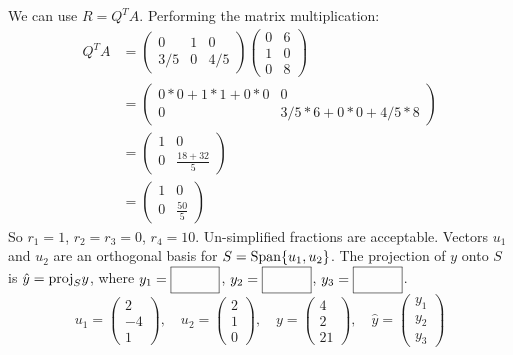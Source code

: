     \ifnum {} {\color{DarkBlue} We can use $R=Q^TA$. Performing the matrix multiplication:
    \begin{align}Q^TA &=  \begin{pmatrix} 0&1&0\\3/5&0&4/5\end{pmatrix} \begin{pmatrix} 0&6\\1&0\\0&8\end{pmatrix} \\
    &=  \begin{pmatrix} 0*0 + 1*1 + 0*0 & 0 \\ 0 & 3/5*6 + 0*0 + 4/5*8 \end{pmatrix} \\
    &= \begin{pmatrix} 1 & 0 \\ 0 & \frac{18+32}{5} \end{pmatrix} \\
    &= \begin{pmatrix} 1 & 0 \\ 0 & \frac{50}{5} \end{pmatrix} 
    \end{align}
    So $r_1 = 1$, $r_2=r_3=0$, $r_4=10$. Un-simplified fractions are acceptable. } \fi 
\fi 
\ifnum {}
    Vectors $u_1$ and $u_2$ are an orthogonal basis for $S=\text{Span}\{u_1,u_2\}$. The projection of $y$ onto $S$ is $\hat y = \text{proj}_Sy$, where $y_1=\framebox{\strut\hspace{1cm}}$, 
    $y_2=\framebox{\strut\hspace{1cm}}$, $y_3 = \framebox{\strut\hspace{1cm}}$. $$u_1 = \begin{pmatrix} 2\\-4\\1\end{pmatrix}, \quad u_2 = \begin{pmatrix} 2\\1\\0\end{pmatrix}, \quad y = \begin{pmatrix} 4\\2\\21\end{pmatrix}, \quad \hat y = \begin{pmatrix} y_1\\y_2\\y_3\end{pmatrix}$$
